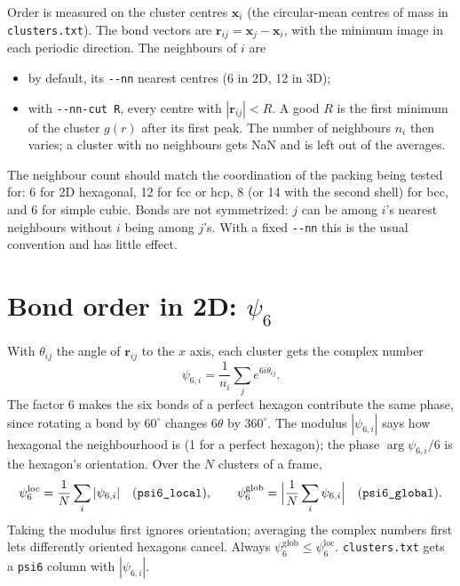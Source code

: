 \documentclass[11pt]{article}
\newcommand{\code}[1]{\texttt{#1}}
\begin{document}
Order is measured on the cluster centres $\mathbf x_i$ (the circular-mean
centres of mass in \code{clusters.txt}). The bond vectors are
$\mathbf r_{ij} = \mathbf x_j - \mathbf x_i$, with the minimum image in each
periodic direction. The neighbours of $i$ are
\begin{itemize}[nosep]
  \item by default, its \code{-{}-nn} nearest centres (6 in 2D, 12 in 3D);
  \item with \code{-{}-nn-cut R}, every centre with $|\mathbf r_{ij}|<R$. A
        good $R$ is the first minimum of the cluster $g(r)$ after its first
        peak. The number of neighbours $n_i$ then varies; a cluster with no
        neighbours gets NaN and is left out of the averages.
\end{itemize}
The neighbour count should match the coordination of the packing being tested
for: 6 for 2D hexagonal, 12 for fcc or hcp, 8 (or 14 with the second shell) for
bcc, and 6 for simple cubic. Bonds are not symmetrized: $j$ can be among $i$'s
nearest neighbours without $i$ being among $j$'s. With a fixed \code{-{}-nn}
this is the usual convention and has little effect.

\section{\texorpdfstring{Bond order in 2D: $\psi_6$}{Bond order in 2D: psi6}}

With $\theta_{ij}$ the angle of $\mathbf r_{ij}$ to the $x$ axis, each cluster
gets the complex number
\begin{equation}
  \psi_{6,i} = \frac{1}{n_i}\sum_{j} e^{6i\theta_{ij}} .
\end{equation}
The factor 6 makes the six bonds of a perfect hexagon contribute the same
phase, since rotating a bond by $60^\circ$ changes $6\theta$ by $360^\circ$.
The modulus $|\psi_{6,i}|$ says how hexagonal the neighbourhood is (1 for a
perfect hexagon); the phase $\arg\psi_{6,i}/6$ is the hexagon's orientation.
Over the $N$ clusters of a frame,
\begin{equation}
  \psi_6^{\mathrm{loc}} = \frac1N\sum_i|\psi_{6,i}|
  \quad(\code{psi6\_local}),\qquad
  \psi_6^{\mathrm{glob}} = \Bigl|\frac1N\sum_i\psi_{6,i}\Bigr|
  \quad(\code{psi6\_global}).
\end{equation}
Taking the modulus first ignores orientation; averaging the complex numbers
first lets differently oriented hexagons cancel. Always
$\psi_6^{\mathrm{glob}}\le\psi_6^{\mathrm{loc}}$. \code{clusters.txt} gets a
\code{psi6} column with $|\psi_{6,i}|$.
\end{document}
